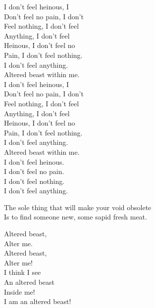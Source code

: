 I don't feel heinous, I \\
Don't feel no pain, I don't \\
Feel nothing, I don't feel \\
Anything, I don't feel \\
Heinous, I don't feel no \\
Pain, I don't feel nothing. \\
I don't feel anything. \\
Altered beast within me. \\

I don't feel heinous, I \\
Don't feel no pain, I don't \\
Feel nothing, I don't feel \\
Anything, I don't feel \\
Heinous, I don't feel no \\
Pain, I don't feel nothing. \\
I don't feel anything. \\
Altered beast within me. \\

I don't feel heinous. \\
I don't feel no pain. \\
I don't feel nothing. \\
I don't feel anything. \\


The sole thing that will make your void obsolete \\
Is to find someone new, some sapid fresh meat. \\


Altered beast, \\
Alter me. \\
Altered beast, \\
Alter me! \\

I think I see \\
An altered beast \\
Inside me! \\

I am an altered beast! \\





